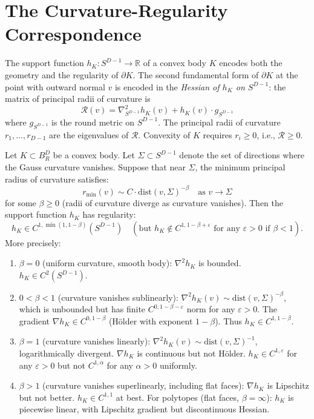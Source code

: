 
\section{The Curvature-Regularity Correspondence}

The support function $h_K : S^{D-1} \to \mathbb{R}$ of a convex body $K$ encodes both the geometry and the regularity of $\partial K$. The second fundamental form of $\partial K$ at the point with outward normal $v$ is encoded in the \emph{Hessian of $h_K$ on $S^{D-1}$}: the matrix of principal radii of curvature is
\[
  \mathcal{R}(v) = \nabla^2_{S^{D-1}} h_K(v) + h_K(v) \cdot g_{S^{D-1}}
\]
where $g_{S^{D-1}}$ is the round metric on $S^{D-1}$. The principal radii of curvature $r_1, \ldots, r_{D-1}$ are the eigenvalues of $\mathcal{R}$. Convexity of $K$ requires $r_i \geq 0$, i.e., $\mathcal{R} \geq 0$.

\begin{lemma}
\label{lem:curv-reg}
Let $K \subset B_R^D$ be a convex body. Let $\Sigma \subset S^{D-1}$ denote the set of directions where the Gauss curvature vanishes. Suppose that near $\Sigma$, the minimum principal radius of curvature satisfies:
\[
  r_{\min}(v) \sim C \cdot \mathrm{dist}(v, \Sigma)^{-\beta} \quad \text{as } v \to \Sigma
\]
for some $\beta \geq 0$ (radii of curvature diverge as curvature vanishes). Then the support function $h_K$ has regularity:
\[
  h_K \in C^{1, \min(1, 1-\beta)}(S^{D-1}) \quad (\text{but } h_K \notin C^{1, 1-\beta+\varepsilon} \text{ for any } \varepsilon > 0 \text{ if } \beta < 1).
\]
More precisely:
\begin{enumerate}[label=(\roman*)]
  \item $\beta = 0$ (uniform curvature, smooth body): $\nabla^2 h_K$ is bounded. $h_K \in C^{2}(S^{D-1})$.
  \item $0 < \beta < 1$ (curvature vanishes sublinearly): $\nabla^2 h_K(v) \sim \mathrm{dist}(v, \Sigma)^{-\beta}$, which is unbounded but has finite $C^{0,1-\beta-\varepsilon}$ norm for any $\varepsilon > 0$. The gradient $\nabla h_K \in C^{0, 1-\beta}$ (H\"older with exponent $1-\beta$). Thus $h_K \in C^{1, 1-\beta}$.
  \item $\beta = 1$ (curvature vanishes linearly): $\nabla^2 h_K(v) \sim \mathrm{dist}(v,\Sigma)^{-1}$, logarithmically divergent. $\nabla h_K$ is continuous but not H\"older. $h_K \in C^{1, \varepsilon}$ for any $\varepsilon > 0$ but not $C^{1, \alpha}$ for any $\alpha > 0$ uniformly.
  \item $\beta > 1$ (curvature vanishes superlinearly, including flat faces): $\nabla h_K$ is Lipschitz but not better. $h_K \in C^{1,1}$ at best. For polytopes (flat faces, $\beta = \infty$): $h_K$ is piecewise linear, with Lipschitz gradient but discontinuous Hessian.
\end{enumerate}
\end{lemma}

